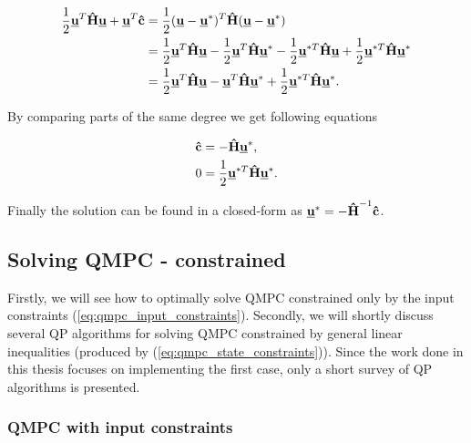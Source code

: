 \begin{equation}
\begin{split}
\frac{1}{2}\textbf{\underline{u}}^T\textbf{\^H}\textbf{\underline{u}} + \textbf{\underline{u}}^T\textbf{\^c} &= \frac{1}{2}(\textbf{\underline{u}} - \textbf{\underline{u}}^*)^T\textbf{\^H}(\textbf{\underline{u}} - \textbf{\underline{u}}^*)\\
&= \frac{1}{2}\textbf{\underline{u}}^T\textbf{\^H}\textbf{\underline{u}} - \frac{1}{2}\textbf{\underline{u}}^T\textbf{\^H}\textbf{\underline{u}}^* - \frac{1}{2}\textbf{\underline{u}}^{*T}\textbf{\^H}\textbf{\underline{u}} + \frac{1}{2}\textbf{\underline{u}}^{*T}\textbf{\^H}\textbf{\underline{u}}^* \\
&= \frac{1}{2}\textbf{\underline{u}}^T\textbf{\^H}\textbf{\underline{u}} -
\textbf{\underline{u}}^T\textbf{\^H}\textbf{\underline{u}}^* + \frac{1}{2}\textbf{\underline{u}}^{*T}\textbf{\^H}\textbf{\underline{u}}^*.
\end{split}
\end{equation}

By comparing parts of the same degree we get following equations

\begin{equation}
\begin{split}
\textbf{\^c} &= -\textbf{\^H}\textbf{\underline{u}}^*, \\
0 &= \frac{1}{2}\textbf{\underline{u}}^{*T}\textbf{\^H}\textbf{\underline{u}}^*.
\end{split}
\end{equation}

Finally the solution can be found in a closed-form as $\textbf{\underline{u}}^* = -\textbf{\^H}^{-1}\textbf{\^c}$.

\subsection{Solving QMPC - constrained}
\label{cap:qmpc_constrained}

Firstly, we will see how to optimally solve QMPC constrained only by the input constraints (\ref{eq:qmpc_input_constraints}). Secondly, we will shortly discuss several QP algorithms for solving QMPC constrained by general linear inequalities (produced by (\ref{eq:qmpc_state_constraints})). Since the work done in this thesis focuses on implementing the first case, only a short survey of QP algorithms is presented.

\subsubsection{QMPC with input constraints}

